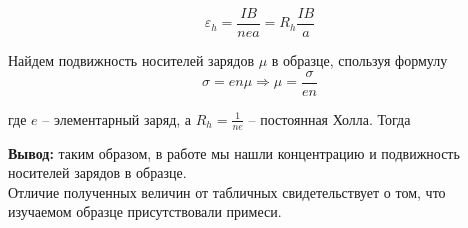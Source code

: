     \begin{equation*}
        \varepsilon_h = \frac{I B}{n e a} = R_h \frac{I B}{a}
    \end{equation*}

    \noindent Найдем подвижность носителей зарядов $\mu$ в образце, спользуя формулу
    \begin{equation*}
        \sigma = e n \mu \Rightarrow \mu = \frac{\sigma}{e n}
    \end{equation*}

    \noindent где $e$ -- элементарный заряд, а $R_h = \frac{1}{n e}$ -- постоянная Холла. Тогда

    

    \noindent \textbf{Вывод:} таким образом, в работе мы нашли концентрацию
    и подвижность носителей зарядов в образце.\\
    Отличие полученных величин от табличных свидетельствует о том,
    что изучаемом образце присутствовали примеси.

